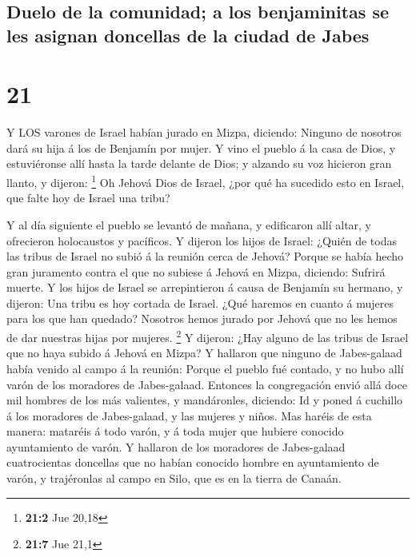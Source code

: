 \hypertarget{duelo-de-la-comunidad-a-los-benjaminitas-se-les-asignan-doncellas-de-la-ciudad-de-jabes}{%
\subsection{Duelo de la comunidad; a los benjaminitas se les asignan
doncellas de la ciudad de
Jabes}\label{duelo-de-la-comunidad-a-los-benjaminitas-se-les-asignan-doncellas-de-la-ciudad-de-jabes}}

\hypertarget{section-20}{%
\section{21}\label{section-20}}

 Y LOS varones de Israel habían jurado en Mizpa, diciendo:
Ninguno de nosotros dará su hija á los de Benjamín por mujer.
 Y vino el pueblo á la casa de Dios, y estuviéronse allí
hasta la tarde delante de Dios; y alzando su voz hicieron gran llanto, y
dijeron: \footnote{\textbf{21:2} Jue 20,18}  Oh Jehová Dios
de Israel, ¿por qué ha sucedido esto en Israel, que falte hoy de Israel
una tribu?

 Y al día siguiente el pueblo se levantó de mañana, y
edificaron allí altar, y ofrecieron holocaustos y pacíficos.
 Y dijeron los hijos de Israel: ¿Quién de todas las tribus
de Israel no subió á la reunión cerca de Jehová? Porque se había hecho
gran juramento contra el que no subiese á Jehová en Mizpa, diciendo:
Sufrirá muerte.  Y los hijos de Israel se arrepintieron á
causa de Benjamín su hermano, y dijeron: Una tribu es hoy cortada de
Israel.  ¿Qué haremos en cuanto á mujeres para los que han
quedado? Nosotros hemos jurado por Jehová que no les hemos de dar
nuestras hijas por mujeres. \footnote{\textbf{21:7} Jue 21,1}
 Y dijeron: ¿Hay alguno de las tribus de Israel que no haya
subido á Jehová en Mizpa? Y hallaron que ninguno de Jabes-galaad había
venido al campo á la reunión:  Porque el pueblo fué contado,
y no hubo allí varón de los moradores de Jabes-galaad. 
Entonces la congregación envió allá doce mil hombres de los más
valientes, y mandáronles, diciendo: Id y poned á cuchillo á los
moradores de Jabes-galaad, y las mujeres y niños.  Mas
haréis de esta manera: mataréis á todo varón, y á toda mujer que hubiere
conocido ayuntamiento de varón.  Y hallaron de los
moradores de Jabes-galaad cuatrocientas doncellas que no habían conocido
hombre en ayuntamiento de varón, y trajéronlas al campo en Silo, que es
en la tierra de Canaán.

